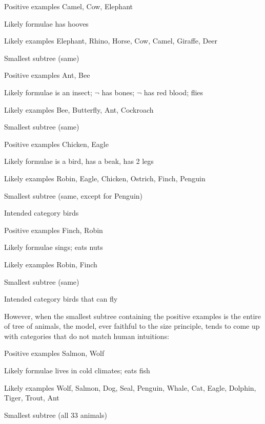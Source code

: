 \documentclass[apacite,jou]{apa6}
\newenvironment{rdescription}%
		{\begin{description}\raggedright}{\end{description}}
\begin{document}
\begin{rdescription}
\item[Positive examples] Camel, Cow, Elephant
\item[Likely formulae] has hooves
\item[Likely examples] Elephant, Rhino, Horse, Cow, Camel,
	Giraffe, Deer
\item[Smallest subtree] (same)
\end{rdescription}

\begin{rdescription}
\item[Positive examples] Ant, Bee
\item[Likely formulae] is an insect; $\neg$ has bones; $\neg$ has red blood;
	flies
\item[Likely examples]
	Bee, Butterfly, Ant, Cockroach
\item[Smallest subtree]
	(same)
\end{rdescription}


\begin{rdescription}
\item[Positive examples] Chicken, Eagle
\item[Likely formulae] is a bird, has a beak, has 2 legs
\item[Likely examples]
	Robin, Eagle, Chicken, Ostrich, Finch, Penguin
\item[Smallest subtree]
	(same, except for Penguin)
\item[Intended category] birds
\end{rdescription}


\begin{rdescription}
\item[Positive examples] Finch, Robin
\item[Likely formulae] sings; eats nuts
\item[Likely examples]
	Robin, Finch
\item[Smallest subtree]
	(same)
\item[Intended category] birds that can fly
\end{rdescription}

However, when the smallest subtree containing the positive examples
 is the entire of tree of animals, the model, ever faithful to the
size principle, tends to come up with categories that do not match
human intuitions:

\begin{rdescription}
\item[Positive examples] Salmon, Wolf
\item[Likely formulae] lives in cold climates; eats fish
\item[Likely examples]
	Wolf, Salmon, Dog, Seal, Penguin, Whale, Cat, Eagle, Dolphin,
	Tiger, Trout, Ant
\item[Smallest subtree]
	(all 33 animals)
\end{rdescription}
\end{document}
